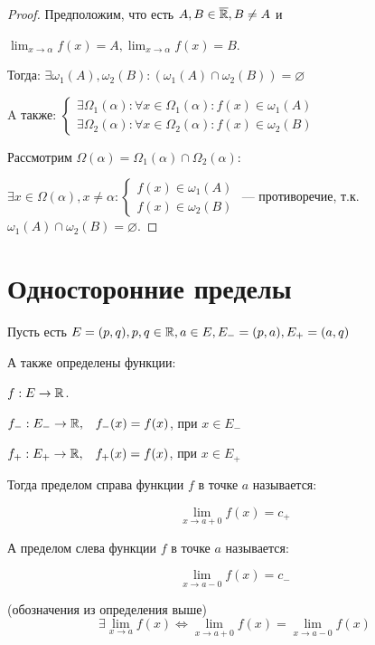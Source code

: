 \begin{proof}
    Предположим, что есть $A, B \in \overline{\mathbb{R}}, B \neq A$ и 
    
    $\lim_{x \to \alpha}f(x) = A, \lim_{x \to \alpha}f(x) = B$.

    Тогда: $\exists \omega_1(A), \omega_2(B): (\omega_1(A) \cap \omega_2(B)) = \varnothing$

    A также: $\begin{cases}
        \exists \Omega_1(\alpha): \forall x \in \Omega_1(\alpha): f(x) \in \omega_1(A) \\
        \exists \Omega_2(\alpha): \forall x \in \Omega_2(\alpha): f(x) \in \omega_2(B)
    \end{cases}$

    Рассмотрим $\Omega(\alpha) = \Omega_1(\alpha) \cap \Omega_2(\alpha)$:

    $\exists x \in \Omega(\alpha), x \neq \alpha: \begin{cases}
        f(x) \in \omega_1(A) \\
        f(x) \in \omega_2(B)
    \end{cases}$ --- противоречие, т.к. $\omega_1(A) \cap \omega_2(B) = \varnothing$.
\end{proof}



\section{Односторонние пределы}

\begin{definition}
    Пусть есть $E = (p, q), p, q \in \mathbb{R}, a \in E, E_- = (p, a), E_+ = (a, q)$
    
    А также определены функции: 
    
    $f: E \to \mathbb{R}$.

    $f_-: E_- \to \mathbb{R}, \; \; \; f_-(x) = f(x)$, при $x \in E_-$

    
    $f_+: E_+ \to \mathbb{R}, \; \; \; f_+(x) = f(x)$, при $x \in E_+$

    Тогда пределом справа функции $f$ в точке $a$ называется:

    $$\lim_{x \to a+0} f(x) = c_+$$

    А пределом слева функции $f$ в точке $a$ называется:

    $$\lim_{x \to a-0} f(x) = c_-$$
\end{definition}


\begin{theorem} (обозначения из определения выше)
    $$\exists \lim_{x \to a} f(x) \Leftrightarrow \lim_{x \to a+0} f(x) = \lim_{x \to a-0} f(x)$$
\end{theorem}

